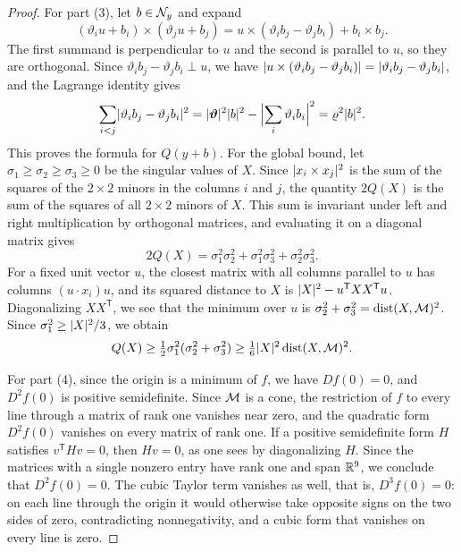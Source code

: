 \begin{proof}
For part (3), let $b\in\mathcal N_{y}$ and expand
\[
 (\vartheta_iu+b_i)\times(\vartheta_ju+b_j)=u\times(\vartheta_ib_j-\vartheta_jb_i)+b_i\times b_j.
\]
The first summand is perpendicular to $u$ and the second is parallel to $u$, so they are orthogonal. Since $\vartheta_ib_j-\vartheta_jb_i\perp u$, we have $\lvert u\times(\vartheta_ib_j-\vartheta_jb_i)\rvert=\lvert \vartheta_ib_j-\vartheta_jb_i\rvert$, and the Lagrange identity gives
\[
 \sum_{i<j}\lvert \vartheta_ib_j-\vartheta_jb_i\rvert^2=\lvert \bm\vartheta\rvert^2\lvert b\rvert^2-\Bigl|\sum_i\vartheta_ib_i\Bigr|^2=\varrho^2\lvert b\rvert^2.
\]
This proves the formula for $Q(y+b)$. For the global bound, let $\sigma_1\ge\sigma_2\ge\sigma_3\ge0$ be the singular values of $X$. Since $\lvert x_i\times x_j\rvert^2$ is the sum of the squares of the $2\times2$ minors in the columns $i$ and $j$, the quantity $2Q(X)$ is the sum of the squares of all $2\times2$ minors of $X$. This sum is invariant under left and right multiplication by orthogonal matrices, and evaluating it on a diagonal matrix gives
\[
 2Q(X)=\sigma_1^2\sigma_2^2+\sigma_1^2\sigma_3^2+\sigma_2^2\sigma_3^2.
\]
For a fixed unit vector $u$, the closest matrix with all columns parallel to $u$ has columns $(u\cdot x_i)u$, and its squared distance to $X$ is $\lvert X\rvert^2-u^{\mathsf T}XX^{\mathsf T}u$. Diagonalizing $XX^{\mathsf T}$, we see that the minimum over $u$ is $\sigma_2^2+\sigma_3^2=\operatorname{dist}(X,\mathcal M)^2$. Since $\sigma_1^2\ge\lvert X\rvert^2/3$, we obtain
\[
 Q(X)\ge\tfrac12\sigma_1^2(\sigma_2^2+\sigma_3^2)\ge\tfrac16\lvert X\rvert^2\operatorname{dist}(X,\mathcal M)^2.
\]

For part (4), since the origin is a minimum of $f$, we have $Df(0)=0$, and $D^2f(0)$ is positive semidefinite. Since $\mathcal M$ is a cone, the restriction of $f$ to every line through a matrix of rank one vanishes near zero, and the quadratic form $D^2f(0)$ vanishes on every matrix of rank one. If a positive semidefinite form $H$ satisfies $v^{\mathsf T}Hv=0$, then $Hv=0$, as one sees by diagonalizing $H$. Since the matrices with a single nonzero entry have rank one and span $\mathbb R^9$, we conclude that $D^2f(0)=0$. The cubic Taylor term vanishes as well, that is, $D^3f(0)=0$: on each line through the origin it would otherwise take opposite signs on the two sides of zero, contradicting nonnegativity, and a cubic form that vanishes on every line is zero.


\end{proof}
